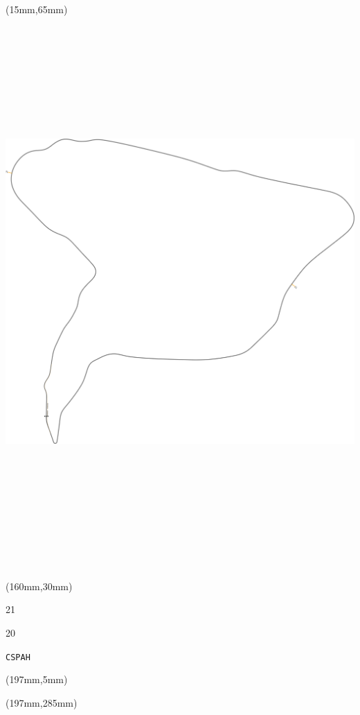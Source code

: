 \begin{textblock*}{185mm}(15mm,65mm)%
\centering
\mbox{\includegraphics[width=185mm,height=210mm,keepaspectratio]{PT/CSPAH.pdf}}
\end{textblock*}
\begin{textblock*}{40mm}(160mm,30mm)%
\Large
\par{} 
\par21 
\par20 
\par\hfill\tiny\tt CSPAH\\
\end{textblock*}
\begin{textblock*}{20mm}(197mm,5mm)%
\fbox{\thepage}
\label{CSPAH}
\end{textblock*}
\begin{textblock*}{20mm}(197mm,285mm)%
\fbox{\thepage}
\end{textblock*}

